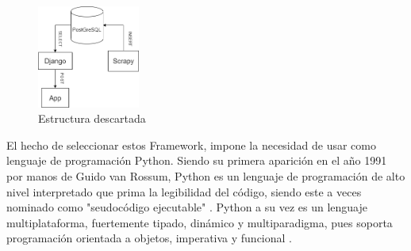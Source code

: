 \begin{figure} [H]
	\centering
	\includegraphics[width=0.3\textwidth]{fig/estructura_descartada.png}
	\caption[Idea original de la estructura de datos planteada]{Estructura descartada}
	\label{fig:ej9}
\end{figure}

El hecho de seleccionar estos Framework, impone la necesidad de usar como lenguaje de programación Python.\newline
\newline
Siendo su primera aparición en el año 1991 por manos de Guido van Rossum, Python es un lenguaje de programación de alto nivel interpretado que prima la legibilidad del código, siendo este a veces nominado como "seudocódigo ejecutable" \cite{dierbach2014python}. Python a su vez es un lenguaje multiplataforma, fuertemente tipado, dinámico y multiparadigma, pues soporta programación orientada a objetos, imperativa y funcional \cite{PyDoc} \cite{borges2014python}.
